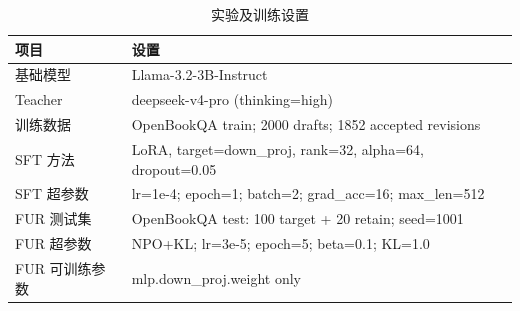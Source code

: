 \begin{table}[H]
\centering
\small
\caption{实验及训练设置}
\label{tab:training}
\begin{tabular}{lp{10.3cm}}
\toprule
项目 & 设置 \\
\midrule
基础模型 & Llama-3.2-3B-Instruct \\
Teacher & deepseek-v4-pro (thinking=high) \\
训练数据 & OpenBookQA train; 2000 drafts; 1852 accepted revisions \\
SFT 方法 & LoRA, target=down\_proj, rank=32, alpha=64, dropout=0.05 \\
SFT 超参数 & lr=1e-4; epoch=1; batch=2; grad\_acc=16; max\_len=512 \\
FUR 测试集 & OpenBookQA test: 100 target + 20 retain; seed=1001 \\
FUR 超参数 & NPO+KL; lr=3e-5; epoch=5; beta=0.1; KL=1.0 \\
FUR 可训练参数 & mlp.down\_proj.weight only \\
\bottomrule
\end{tabular}
\end{table}
